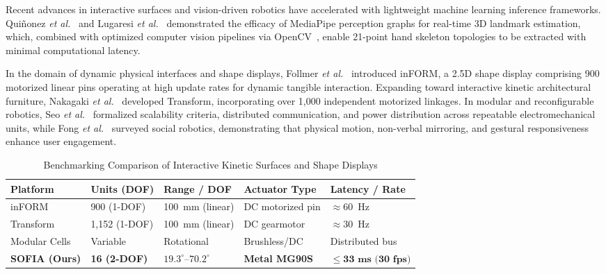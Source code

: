 \documentclass[lettersize,journal]{IEEEtran}
\begin{document}
	Recent advances in interactive surfaces and vision-driven robotics have accelerated with lightweight machine learning inference frameworks. Qui{\~n}onez \textit{et al.}~\cite{quinonez2022mediapipe} and Lugaresi \textit{et al.}~\cite{lugaresi2019mediapipe} demonstrated the efficacy of MediaPipe perception graphs for real-time 3D landmark estimation, which, combined with optimized computer vision pipelines via OpenCV~\cite{bradski2000opencv}, enable 21-point hand skeleton topologies to be extracted with minimal computational latency.
	
	In the domain of dynamic physical interfaces and shape displays, Follmer \textit{et al.}~\cite{follmer2013inform} introduced inFORM, a 2.5D shape display comprising 900 motorized linear pins operating at high update rates for dynamic tangible interaction. Expanding toward interactive kinetic architectural furniture, Nakagaki \textit{et al.}~\cite{nakagaki2016transform} developed Transform, incorporating over 1,000 independent motorized linkages. In modular and reconfigurable robotics, Seo \textit{et al.}~\cite{seo2019modular} formalized scalability criteria, distributed communication, and power distribution across repeatable electromechanical units, while Fong \textit{et al.}~\cite{fong2003social} surveyed social robotics, demonstrating that physical motion, non-verbal mirroring, and gestural responsiveness enhance user engagement.
	
	\begin{table}[!t]
		\centering
		\caption{Benchmarking Comparison of Interactive Kinetic Surfaces and Shape Displays}
		\label{tab:benchmarking}
		\scriptsize
		\renewcommand{\arraystretch}{1.08}
		\begin{tabular}{p{1.8cm} p{1.1cm} p{1.1cm} p{1.3cm} p{1.4cm}}
			\toprule
			\textbf{Platform} & \textbf{Units (DOF)} & \textbf{Range / DOF} & \textbf{Actuator Type} & \textbf{Latency / Rate} \\
			\midrule
			inFORM~\cite{follmer2013inform} & 900 (1-DOF) & 100~mm (linear) & DC motorized pin & $\approx 60$~Hz \\
			Transform~\cite{nakagaki2016transform} & 1,152 (1-DOF) & 100~mm (linear) & DC gearmotor & $\approx 30$~Hz \\
			Modular Cells~\cite{seo2019modular} & Variable & Rotational & Brushless/DC & Distributed bus \\
			\textbf{SOFIA (Ours)} & \textbf{16 (2-DOF)} & $\mathbf{19.3^\circ\text{--}70.2^\circ}$ & \textbf{Metal MG90S} & $\mathbf{\le 33\text{ ms (30~fps)}}$ \\
			\bottomrule
		\end{tabular}
	\end{table}
	
\end{document}
